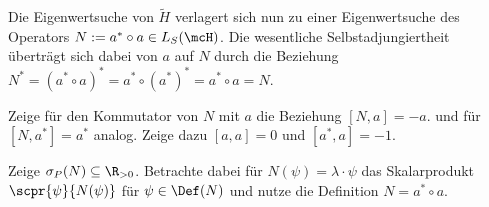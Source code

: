 \documentclass{subfiles}
\begin{document}
        Die Eigenwertsuche von $\tilde H$ verlagert sich nun zu einer Eigenwertsuche des Operators $N := a^*\circ a \in L_S(\mcH)$. Die wesentliche Selbstadjungiertheit überträgt sich dabei von $a$ auf $N$ durch die Beziehung $N^* = (a^*\circ a)^* = a^*\circ(a^*)^* = a^*\circ a = N$. 
        \begin{Aufgabe}
            \nr{} Zeige für den Kommutator von $N$ mit $a$ die Beziehung $[N,a] = -a$. und für $[N,a^*] = a^*$ analog. Zeige dazu $[a,a] = 0$ und $[a^*,a] = -1$. 

            \nr{} Zeige $\sigma_P(N)\subseteq\R_{>0}$. Betrachte dabei für $N(\psi) = \lambda\cdot\psi$ das Skalarprodukt $\scpr{\psi}{N(\psi)}$ für $\psi\in\Def(N)$ und nutze die Definition $N = a^*\circ a$. 
        \end{Aufgabe} 
\end{document}
